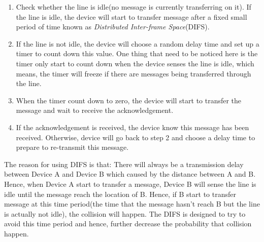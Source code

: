 \documentclass[10pt,a4paper]{article}
\begin{document}
\begin{enumerate}
	\item Check whether the line is idle(no message is currently transferring on it). If the line is idle, the device will start to transfer message after a fixed small period of time known as \textit{Distributed Inter-frame Space}(DIFS).
	\item If the line is not idle, the device will choose a random delay time and set up a timer to count down this value. One thing that need to be noticed here is the timer only start to count down when the device senses the line is idle, which means, the timer will freeze if there are messages being transferred through the line. 
	\item When the timer count down to zero, the device will start to transfer the message and wait to receive the acknowledgement.
	\item If the acknowledgement is received, the device know this message has been received. Otherwise, device will go back to step 2 and choose a delay time to prepare to re-transmit this message.
\end{enumerate} 
The reason for using DIFS is that: There will always be a transmission delay between Device A and Device B which caused by the distance between A and B. Hence, when Device A start to transfer a message, Device B will sense the line is idle until the message reach the location of B. Hence, if B start to transfer message at this time period(the time that the message hasn't reach B but the line is actually not idle), the collision will happen. The DIFS is designed to try to avoid this time period and hence, further decrease the probability that collision happen.
\end{document}
